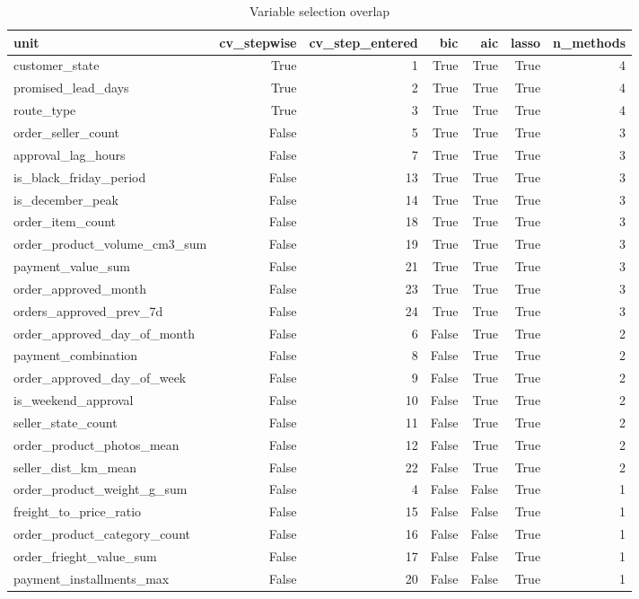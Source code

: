 \begin{table}[htbp]
\centering
\small
\caption{Variable selection overlap}
\begin{tabular}{lrrrrrr}
\toprule
unit & cv\_stepwise & cv\_step\_entered & bic & aic & lasso & n\_methods \\
\midrule
customer\_state & True & 1 & True & True & True & 4 \\
promised\_lead\_days & True & 2 & True & True & True & 4 \\
route\_type & True & 3 & True & True & True & 4 \\
order\_seller\_count & False & 5 & True & True & True & 3 \\
approval\_lag\_hours & False & 7 & True & True & True & 3 \\
is\_black\_friday\_period & False & 13 & True & True & True & 3 \\
is\_december\_peak & False & 14 & True & True & True & 3 \\
order\_item\_count & False & 18 & True & True & True & 3 \\
order\_product\_volume\_cm3\_sum & False & 19 & True & True & True & 3 \\
payment\_value\_sum & False & 21 & True & True & True & 3 \\
order\_approved\_month & False & 23 & True & True & True & 3 \\
orders\_approved\_prev\_7d & False & 24 & True & True & True & 3 \\
order\_approved\_day\_of\_month & False & 6 & False & True & True & 2 \\
payment\_combination & False & 8 & False & True & True & 2 \\
order\_approved\_day\_of\_week & False & 9 & False & True & True & 2 \\
is\_weekend\_approval & False & 10 & False & True & True & 2 \\
seller\_state\_count & False & 11 & False & True & True & 2 \\
order\_product\_photos\_mean & False & 12 & False & True & True & 2 \\
seller\_dist\_km\_mean & False & 22 & False & True & True & 2 \\
order\_product\_weight\_g\_sum & False & 4 & False & False & True & 1 \\
freight\_to\_price\_ratio & False & 15 & False & False & True & 1 \\
order\_product\_category\_count & False & 16 & False & False & True & 1 \\
order\_frieght\_value\_sum & False & 17 & False & False & True & 1 \\
payment\_installments\_max & False & 20 & False & False & True & 1 \\
\bottomrule
\end{tabular}
\par\smallskip\begin{minipage}{\linewidth}\footnotesize \end{minipage}
\end{table}

